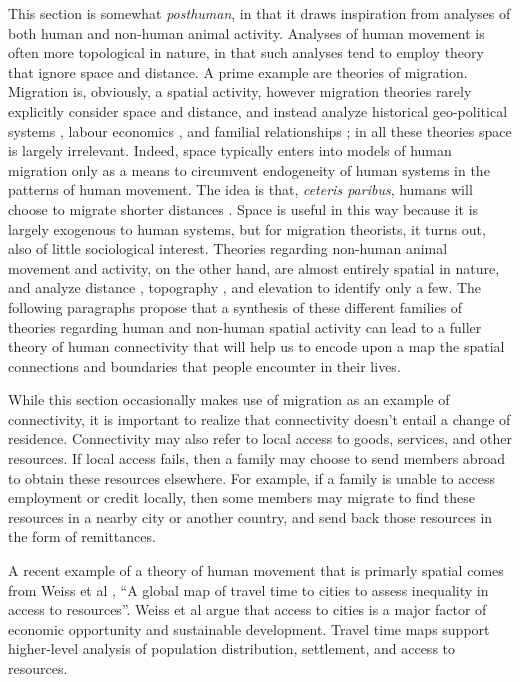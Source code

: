 \documentclass[draft]{article}
\begin{document}
This section is somewhat {\em posthuman}, in that it draws inspiration from analyses of both human and non-human animal activity.  Analyses of human movement is often more topological in nature, in that such analyses tend to employ theory that ignore space and distance.  A prime example are theories of migration.  Migration is, obviously, a spatial activity, however migration theories rarely explicitly consider space and distance, and instead analyze historical geo-political systems \cite{wallerstein74}, labour economics \cite{harris70, stark85}, and familial relationships \cite{macdonald64, myrdal57, massey90}; in all these theories space is largely irrelevant.  Indeed, space typically enters into models of human migration only as a means to circumvent endogeneity of human systems in the patterns of human movement.  The idea is that, {\em ceteris paribus}, humans will choose to migrate shorter distances \cite{woodruff07, garip12}.  Space is useful in this way because it is largely exogenous to human systems, but for migration theorists, it turns out, also of little sociological interest.  Theories regarding non-human animal movement and activity, on the other hand, are almost entirely spatial in nature, and analyze distance \cite{peer08}, topography \cite{peer06}, and elevation \cite{alderman07} to identify only a few.  The following paragraphs propose that a synthesis of these different families of theories regarding human and non-human spatial activity can lead to a fuller theory of human connectivity that will help us to encode upon a map the spatial connections and boundaries that people encounter in their lives.

While this section occasionally makes use of migration as an example of connectivity, it is important to realize that connectivity doesn't entail a change of residence.  Connectivity may also refer to local access to goods, services, and other resources.  If local access fails, then a family may choose to send members abroad to obtain these resources elsewhere.  For example, if a family is unable to access employment or credit locally, then some members may migrate to find these resources in a nearby city or another country, and send back those resources in the form of remittances.

A recent example of a theory of human movement that is primarly spatial comes from Weiss et al \cite{weiss18}, ``A global map of travel time to cities to assess inequality in access to resources''.  Weiss et al argue that access to cities is a major factor of economic opportunity and sustainable development.  Travel time maps support higher-level analysis of population distribution, settlement, and access to resources.
\end{document}
